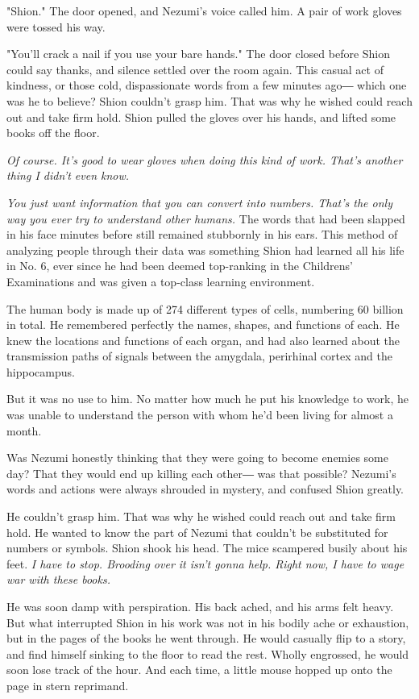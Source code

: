 "Shion." The door opened, and Nezumi's voice called him. A pair of work
gloves were tossed his way.

"You'll crack a nail if you use your bare hands." The door closed before
Shion could say thanks, and silence settled over the room again. This
casual act of kindness, or those cold, dispassionate words from a few
minutes ago― which one was he to believe? Shion couldn't grasp him. That
was why he wished could reach out and take firm hold. Shion pulled the
gloves over his hands, and lifted some books off the floor.

\emph{Of course. It's good to wear gloves when doing this kind of work. That's
another thing I didn't even know.}

\emph{You just want information that you can convert into numbers. That's the
only way you ever try to understand other humans.} The words that had
been slapped in his face minutes before still remained stubbornly in his
ears. This method of analyzing people through their data was something
Shion had learned all his life in No. 6, ever since he had been deemed
top-ranking in the Childrens' Examinations and was given a top-class
learning environment.

The human body is made up of 274 different types of cells, numbering 60
billion in total. He remembered perfectly the names, shapes, and
functions of each. He knew the locations and functions of each organ,
and had also learned about the transmission paths of signals between the
amygdala, perirhinal cortex and the hippocampus.

But it was no use to him. No matter how much he put his knowledge to
work, he was unable to understand the person with whom he'd been living
for almost a month.

Was Nezumi honestly thinking that they were going to become enemies some
day? That they would end up killing each other― was that possible?
Nezumi's words and actions were always shrouded in mystery, and confused
Shion greatly.

He couldn't grasp him. That was why he wished could reach out and take
firm hold. He wanted to know the part of Nezumi that couldn't be
substituted for numbers or symbols. Shion shook his head. The mice
scampered busily about his feet. \emph{I have to stop. Brooding over it isn't
gonna help. Right now, I have to wage war with these books.}

He was soon damp with perspiration. His back ached, and his arms felt
heavy. But what interrupted Shion in his work was not in his bodily ache
or exhaustion, but in the pages of the books he went through. He would
casually flip to a story, and find himself sinking to the floor to read
the rest. Wholly engrossed, he would soon lose track of the hour. And
each time, a little mouse hopped up onto the page in stern reprimand.

